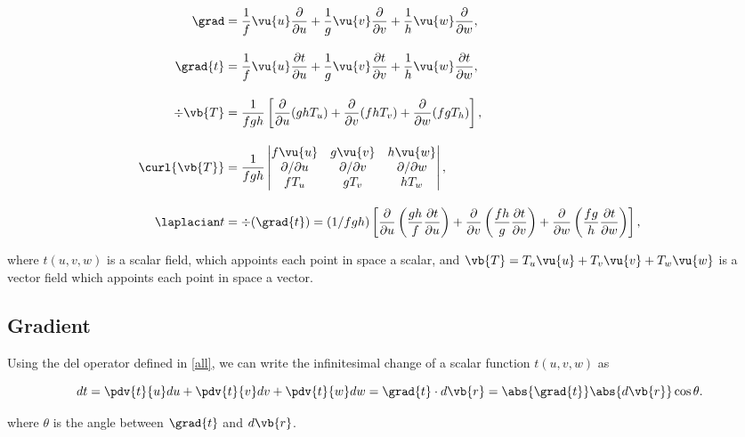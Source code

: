 \documentclass[english,a4paper,12pt]{report}
\begin{document}
\begin{equation} \label{all} 
\begin{aligned}
\grad &= \frac{1}{f}\vu{u}\frac{\partial}{\partial u} + \frac{1}{g}\vu{v}\frac{\partial}{\partial v} + \frac{1}{h}\vu{w}\frac{\partial}{\partial w}, \\[10pt]
\grad{t }&= \frac{1}{f} \vu{u} \frac{\partial t}{\partial u} 
+ \frac{1}{g} \vu{v}\frac{\partial t}{\partial v}  
+ \frac{1}{h} \vu{w}\frac{\partial t}{\partial w} , \\[10pt]
\div{\vb{T}}  &= \frac{1}{fgh} \left[ 
\frac{\partial}{\partial u} (ghT_{u} ) + 
\frac{\partial}{\partial v} (fhT_{v} )+ 
\frac{\partial}{\partial w} (fgT_{h} ) \right], \\[10pt]
\curl{\vb{T} }  &= \frac{1}{fgh} 
\begin{vmatrix} 
f \vu{u} & g \vu{v} & h \vu{w} \\ 
\partial /\partial u & \partial /\partial v & \partial /\partial w \\ 
fT_{u}  & g T_{v}  & h T_{w}  
\end{vmatrix}, \\[10pt]
\laplacian t &= \div{(\grad{t} )} =  (1 / fgh) \left[
\frac{\partial}{\partial u} \left( \frac{gh}{f} \frac{\partial t}{\partial u} \right) + 
\frac{\partial}{\partial v} \left( \frac{fh}{g} \frac{\partial t}{\partial v} \right) + 
\frac{\partial}{\partial w} \left( \frac{fg}{h} \frac{\partial t}{\partial w} \right)
\right],
\end{aligned}
\end{equation}

where \(t (u,v,w)\) is a scalar field, which appoints each point in space a scalar, and \(\vb{T} = T_{u}\vu{u} + T_{v}\vu{v} + T_{w}\vu{w} \) is a vector field which appoints each point in space a vector.  

\subsection{Gradient}
Using the del operator defined in \cref{all}, we can write the infinitesimal change of a scalar function \(t(u,v,w)\) as

\begin{equation}
    dt = \pdv{t}{u}du + \pdv{t}{v}dv + \pdv{t}{w}dw = \grad{t} \cdot d\vb{r}  = \abs{\grad{t} }\abs{d \vb{r} }\cos \theta   . \label{dt} 
\end{equation}

where \(\theta\) is the angle between \(\grad{t}\) and \(d\vb{r}\).
	
\end{document}
